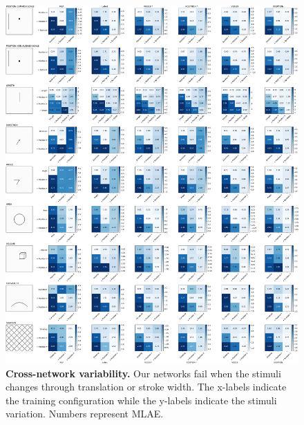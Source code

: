 \documentclass[journal]{vgtc}                %
\begin{document}
\begin{figure}[p]
	\centering
	  \includegraphics[width=\linewidth]{cross_network_new.pdf}
  \caption{\textbf{Cross-network variability.} Our networks fail when the stimuli changes through translation or stroke width. The x-labels indicate the training configuration while the y-labels indicate the stimuli variation. Numbers represent MLAE.}
	\label{fig:cross_network}
\end{figure}
\end{document}
